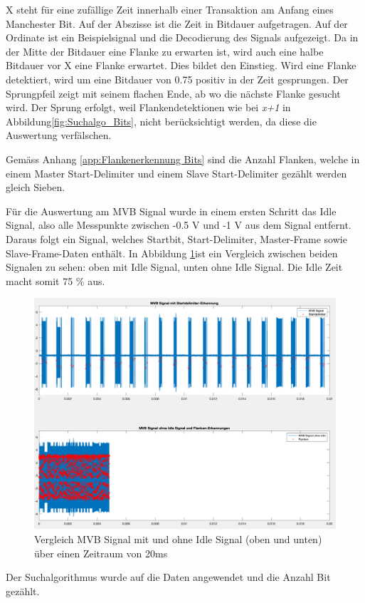 X steht für eine zufällige Zeit innerhalb einer Transaktion am Anfang eines Manchester Bit. Auf der Abszisse ist die Zeit in Bitdauer aufgetragen. Auf der Ordinate ist ein Beispielsignal und die Decodierung des Signals aufgezeigt. Da in der Mitte der Bitdauer eine Flanke zu erwarten ist, wird auch eine halbe Bitdauer vor X eine Flanke erwartet. Dies bildet den Einstieg. Wird eine Flanke detektiert, wird um eine Bitdauer von 0.75 positiv in der Zeit gesprungen. Der Sprungpfeil zeigt mit seinem flachen Ende, ab wo die nächste Flanke gesucht wird. Der Sprung erfolgt, weil Flankendetektionen wie bei \textit{x+1} in Abbildung\ref{fig:Suchalgo_Bits},  nicht berücksichtigt werden, da diese die Auswertung verfälschen.

Gemäss Anhang \ref{app:Flankenerkennung Bits} sind die Anzahl Flanken, welche in einem Master Start-Delimiter und einem Slave Start-Delimiter gezählt werden gleich Sieben.

Für die Auswertung am MVB Signal wurde in einem ersten Schritt das Idle Signal, also alle Messpunkte zwischen -0.5 V und -1 V aus dem Signal entfernt. Daraus folgt ein Signal,  welches Startbit, Start-Delimiter, Master-Frame sowie Slave-Frame-Daten enthält. In Abbildung \ref{fig:ReineDaten}ist ein Vergleich zwischen beiden Signalen zu sehen: oben mit Idle Signal, unten ohne Idle Signal. Die Idle Zeit macht somit 75 \% aus. 

\begin{figure}[H]
    \centering
    \includegraphics[width=0.75\linewidth]{Figures/Chap3/Busauslastung/Vergleich_MVB_mit_ohne_Idle.png}
    \caption{Vergleich MVB Signal mit und ohne Idle Signal (oben und unten) über einen Zeitraum von 20ms}
    \label{fig:ReineDaten}
\end{figure}

Der Suchalgorithmus wurde auf die Daten angewendet und die Anzahl Bit gezählt.

